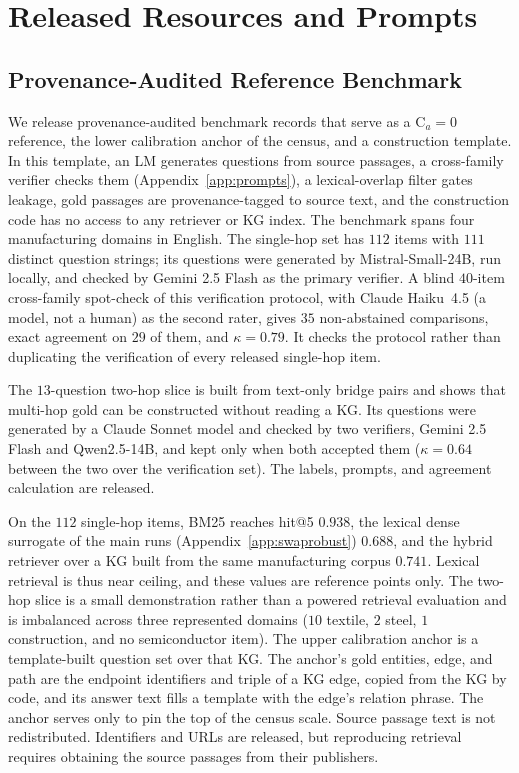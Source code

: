 \documentclass[11pt]{article}
\newcommand{\C}{\mathrm{C}}
\begin{document}
\section{Released Resources and Prompts}
\subsection{Provenance-Audited Reference Benchmark}
\label{app:protocol}
We release provenance-audited benchmark records that serve as a $\C_a=0$ reference, the lower calibration anchor of the census, and a construction template. In this template, an LM generates questions from source passages, a cross-family verifier checks them (Appendix~\ref{app:prompts}), a lexical-overlap filter gates leakage, gold passages are provenance-tagged to source text, and the construction code has no access to any retriever or KG index. The benchmark spans four manufacturing domains in English. The single-hop set has $112$ items with $111$ distinct question strings; its questions were generated by Mistral-Small-24B, run locally, and checked by Gemini 2.5 Flash as the primary verifier. A blind $40$-item cross-family spot-check of this verification protocol, with Claude Haiku~4.5 (a model, not a human) as the second rater, gives $35$ non-abstained comparisons, exact agreement on $29$ of them, and $\kappa=0.79$. It checks the protocol rather than duplicating the verification of every released single-hop item.

The $13$-question two-hop slice is built from text-only bridge pairs and shows that multi-hop gold can be constructed without reading a KG. Its questions were generated by a Claude Sonnet model and checked by two verifiers, Gemini 2.5 Flash and Qwen2.5-14B, and kept only when both accepted them ($\kappa=0.64$ between the two over the verification set). The labels, prompts, and agreement calculation are released.

On the $112$ single-hop items, BM25 reaches hit@5 $0.938$, the lexical dense surrogate of the main runs (Appendix~\ref{app:swaprobust}) $0.688$, and the hybrid retriever over a KG built from the same manufacturing corpus $0.741$. Lexical retrieval is thus near ceiling, and these values are reference points only. The two-hop slice is a small demonstration rather than a powered retrieval evaluation and is imbalanced across three represented domains ($10$ textile, $2$ steel, $1$ construction, and no semiconductor item). The upper calibration anchor is a template-built question set over that KG. The anchor's gold entities, edge, and path are the endpoint identifiers and triple of a KG edge, copied from the KG by code, and its answer text fills a template with the edge's relation phrase. The anchor serves only to pin the top of the census scale. Source passage text is not redistributed. Identifiers and URLs are released, but reproducing retrieval requires obtaining the source passages from their publishers.
\end{document}
